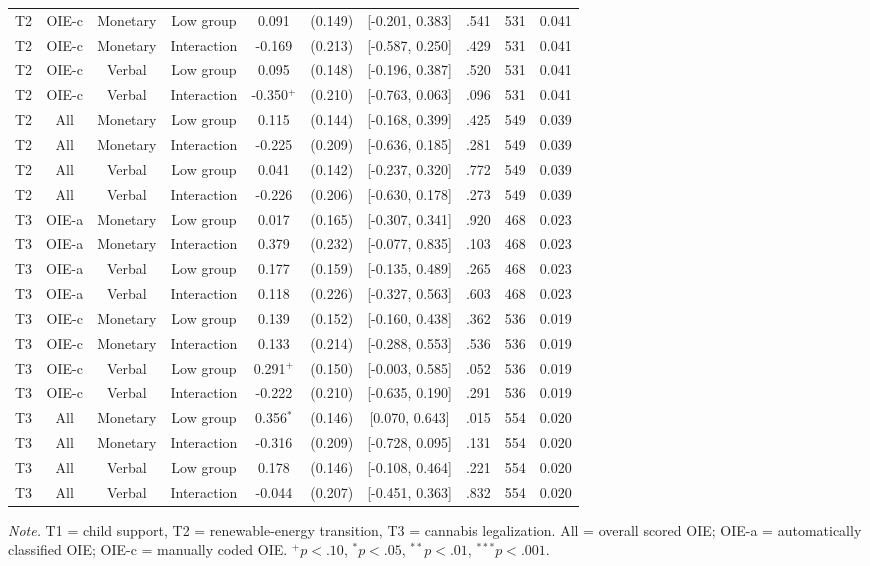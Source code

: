 \begin{table}[htbp]
\begin{threeparttable}
\begin{tabular}{lccccccccc}
  T2 & OIE-c & Monetary & Low group & 0.091 & (0.149) & [-0.201, 0.383] & .541 & 531 & 0.041 \\
  T2 & OIE-c & Monetary & Interaction & -0.169 & (0.213) & [-0.587, 0.250] & .429 & 531 & 0.041 \\
  T2 & OIE-c & Verbal & Low group & 0.095 & (0.148) & [-0.196, 0.387] & .520 & 531 & 0.041 \\
  T2 & OIE-c & Verbal & Interaction & -0.350$^{+}$ & (0.210) & [-0.763, 0.063] & .096 & 531 & 0.041 \\
  T2 & All & Monetary & Low group & 0.115 & (0.144) & [-0.168, 0.399] & .425 & 549 & 0.039 \\
  T2 & All & Monetary & Interaction & -0.225 & (0.209) & [-0.636, 0.185] & .281 & 549 & 0.039 \\
  T2 & All & Verbal & Low group & 0.041 & (0.142) & [-0.237, 0.320] & .772 & 549 & 0.039 \\
  T2 & All & Verbal & Interaction & -0.226 & (0.206) & [-0.630, 0.178] & .273 & 549 & 0.039 \\
  T3 & OIE-a & Monetary & Low group & 0.017 & (0.165) & [-0.307, 0.341] & .920 & 468 & 0.023 \\
  T3 & OIE-a & Monetary & Interaction & 0.379 & (0.232) & [-0.077, 0.835] & .103 & 468 & 0.023 \\
  T3 & OIE-a & Verbal & Low group & 0.177 & (0.159) & [-0.135, 0.489] & .265 & 468 & 0.023 \\
  T3 & OIE-a & Verbal & Interaction & 0.118 & (0.226) & [-0.327, 0.563] & .603 & 468 & 0.023 \\
  T3 & OIE-c & Monetary & Low group & 0.139 & (0.152) & [-0.160, 0.438] & .362 & 536 & 0.019 \\
  T3 & OIE-c & Monetary & Interaction & 0.133 & (0.214) & [-0.288, 0.553] & .536 & 536 & 0.019 \\
  T3 & OIE-c & Verbal & Low group & 0.291$^{+}$ & (0.150) & [-0.003, 0.585] & .052 & 536 & 0.019 \\
  T3 & OIE-c & Verbal & Interaction & -0.222 & (0.210) & [-0.635, 0.190] & .291 & 536 & 0.019 \\
  T3 & All & Monetary & Low group & 0.356$^{*}$ & (0.146) & [0.070, 0.643] & .015 & 554 & 0.020 \\
  T3 & All & Monetary & Interaction & -0.316 & (0.209) & [-0.728, 0.095] & .131 & 554 & 0.020 \\
  T3 & All & Verbal & Low group & 0.178 & (0.146) & [-0.108, 0.464] & .221 & 554 & 0.020 \\
  T3 & All & Verbal & Interaction & -0.044 & (0.207) & [-0.451, 0.363] & .832 & 554 & 0.020 \\
\bottomrule
\end{tabular}
\begin{tablenotes}\footnotesize\item \textit{Note.} T1 = child support, T2 = renewable-energy transition, T3 = cannabis legalization. All = overall scored OIE; OIE-a = automatically classified OIE; OIE-c = manually coded OIE. $^{+}p<.10$, $^{*}p<.05$, $^{**}p<.01$, $^{***}p<.001$.\end{tablenotes}
\end{threeparttable}
\end{table}
